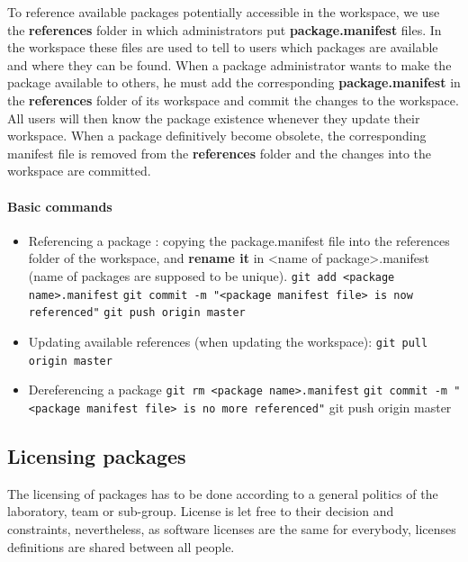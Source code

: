 \documentclass[12pt,a4paper]{article}
\begin{document}
To reference available packages potentially accessible in the workspace, we use the \textbf{references} folder in which administrators put \textbf{package.manifest} files. In the workspace these files are used to tell to users which packages are available and where they can be found. When a package administrator wants to make the package available to others, he must add the corresponding \textbf{package.manifest} in the \textbf{references} folder of its workspace and commit the changes to the workspace. All users will then know the package existence whenever they update their workspace. When a package definitively become obsolete, the corresponding manifest file is removed from the \textbf{references} folder and the changes into the workspace are committed.

\paragraph{Basic commands}
\begin{itemize}
\item Referencing a package :
\linebreak copying the package.manifest file into the references folder of the workspace, and \textbf{rename it} in <name of package>.manifest (name of packages are supposed to be unique).
\linebreak \texttt{git add <package name>.manifest}
\linebreak \texttt{git commit -m "<package manifest file> is now referenced"}
\linebreak \texttt{git push origin master}
\item Updating available references (when updating the workspace):
\linebreak \texttt{git pull origin master}
\item Dereferencing a package
\linebreak \texttt{git rm <package name>.manifest}
\linebreak \texttt{git commit -m "<package manifest file> is no more referenced"}
\linebreak git push origin master
\end{itemize}

\subsection{Licensing packages}

The licensing of packages has to be done according to a general politics of the laboratory, team or sub-group. License is let free to their decision and constraints, nevertheless, as software licenses are the same for everybody, licenses definitions are shared between all people.
\end{document}
